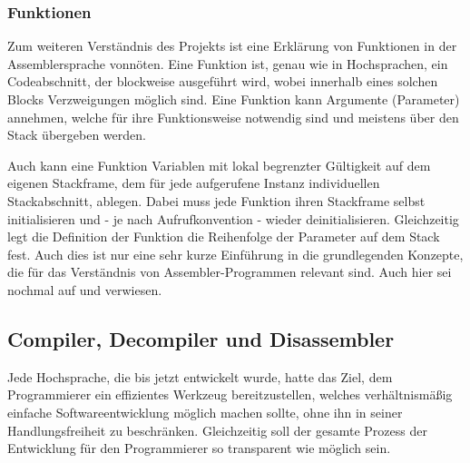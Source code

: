 \documentclass[11pt]{article}
\begin{document}
\subsubsection{Funktionen}
Zum weiteren Verständnis des Projekts ist eine Erklärung von Funktionen in der Assemblersprache vonnöten.
Eine Funktion ist, genau wie in Hochsprachen, ein Codeabschnitt, der blockweise ausgeführt wird,
wobei innerhalb eines solchen Blocks Verzweigungen möglich sind. Eine Funktion kann Argumente
(Parameter) annehmen, welche für ihre Funktionsweise notwendig sind und meistens über den Stack
übergeben werden.

Auch kann eine Funktion Variablen mit lokal begrenzter Gültigkeit auf dem eigenen
Stackframe, dem für jede aufgerufene Instanz individuellen Stackabschnitt, ablegen.
Dabei muss jede Funktion ihren Stackframe selbst initialisieren und - je nach Aufrufkonvention -
wieder deinitialisieren. Gleichzeitig legt die Definition der Funktion die Reihenfolge der Parameter
auf dem Stack fest. Auch dies ist nur eine sehr kurze Einführung in die grundlegenden Konzepte, die
für das Verständnis von Assembler-Programmen relevant sind. Auch hier sei nochmal auf
\cite{wikibook1:7} und \cite{wikibook2:8} verwiesen.

\subsection{Compiler, Decompiler und Disassembler}
Jede Hochsprache, die bis jetzt entwickelt wurde, hatte das Ziel, dem Programmierer ein effizientes
Werkzeug bereitzustellen, welches verhältnismäßig einfache Softwareentwicklung möglich machen
sollte, ohne ihn in seiner Handlungsfreiheit zu beschränken. Gleichzeitig soll der gesamte Prozess
der Entwicklung für den Programmierer so transparent wie möglich sein.
\end{document}
